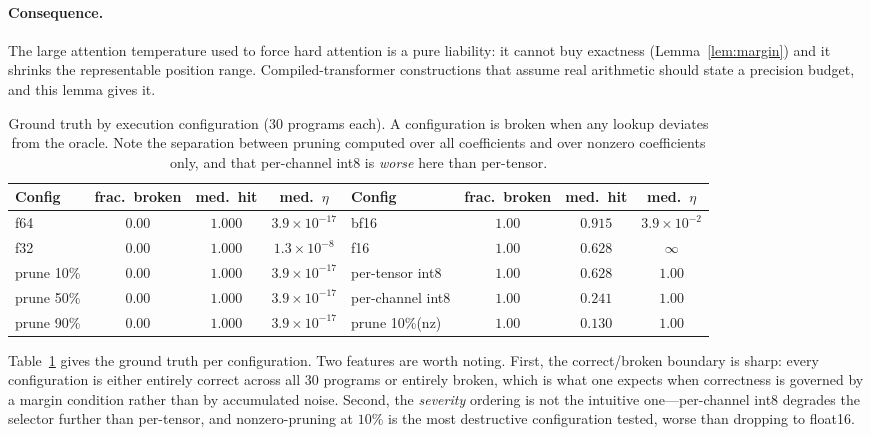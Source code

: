 \documentclass{article}
\theoremstyle{definition}
\newcommand{\bwe}{\ensuremath{\eta}}
\begin{document}
\paragraph{Consequence.} The large attention temperature used to force
hard attention is a pure liability: it cannot buy exactness (Lemma~\ref{lem:margin})
and it shrinks the representable position range. Compiled-transformer
constructions that assume real arithmetic should state a precision budget, and
this lemma gives it.

\begin{table}[t]
\caption{Ground truth by execution configuration (30 programs each). A
configuration is broken when any lookup deviates from the oracle. Note the
separation between pruning computed over all coefficients and over nonzero
coefficients only, and that per-channel int8 is \emph{worse} here than
per-tensor.}
\label{tab:byconfig}
\begin{center}
\begin{tabular}{lccc|lccc}
\toprule
Config & frac.\ broken & med.\ hit & med.\ $\bwe$ &
Config & frac.\ broken & med.\ hit & med.\ $\bwe$ \\
\midrule
f64        & $0.00$ & $1.000$ & $3.9\!\times\!10^{-17}$ & bf16             & $1.00$ & $0.915$ & $3.9\!\times\!10^{-2}$ \\
f32        & $0.00$ & $1.000$ & $1.3\!\times\!10^{-8}$  & f16              & $1.00$ & $0.628$ & $\infty$ \\
prune 10\% & $0.00$ & $1.000$ & $3.9\!\times\!10^{-17}$ & per-tensor int8  & $1.00$ & $0.628$ & $1.00$ \\
prune 50\% & $0.00$ & $1.000$ & $3.9\!\times\!10^{-17}$ & per-channel int8 & $1.00$ & $0.241$ & $1.00$ \\
prune 90\% & $0.00$ & $1.000$ & $3.9\!\times\!10^{-17}$ & prune 10\%(nz)   & $1.00$ & $0.130$ & $1.00$ \\
\bottomrule
\end{tabular}
\end{center}
\end{table}

Table~\ref{tab:byconfig} gives the ground truth per configuration. Two features
are worth noting. First, the correct/broken boundary is sharp: every
configuration is either entirely correct across all 30 programs or entirely
broken, which is what one expects when correctness is governed by a margin
condition rather than by accumulated noise. Second, the \emph{severity} ordering
is not the intuitive one---per-channel int8 degrades the selector further than
per-tensor, and nonzero-pruning at $10\%$ is the most destructive configuration
tested, worse than dropping to float16.
\end{document}
